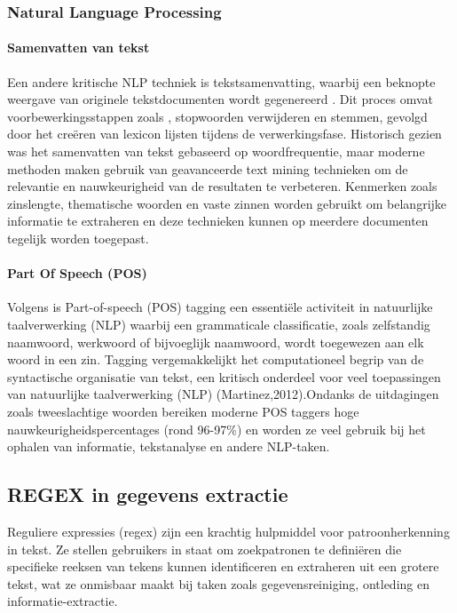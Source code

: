 \subsubsection{Natural Language Processing}
\paragraph{Samenvatten van tekst }

Een andere kritische NLP techniek is tekstsamenvatting, waarbij een beknopte weergave van originele tekstdocumenten wordt gegenereerd \autocite{Talib2016TextMining}. Dit proces omvat voorbewerkingsstappen zoals , stopwoorden verwijderen en stemmen, gevolgd door het creëren van lexicon lijsten tijdens de verwerkingsfase. Historisch gezien was het samenvatten van tekst gebaseerd op woordfrequentie, maar moderne methoden maken gebruik van geavanceerde text mining technieken om de relevantie en nauwkeurigheid van de resultaten te verbeteren. Kenmerken zoals zinslengte, thematische woorden en vaste zinnen worden gebruikt om belangrijke informatie te extraheren en deze technieken kunnen op meerdere documenten tegelijk worden toegepast.

\paragraph{Part Of Speech (POS)}
Volgens \textcite{Martinez2024} is Part-of-speech (POS) tagging een essentiële activiteit in natuurlijke taalverwerking (NLP) waarbij een grammaticale classificatie, zoals zelfstandig naamwoord, werkwoord of bijvoeglijk naamwoord, wordt toegewezen aan elk woord in een zin. Tagging vergemakkelijkt het computationeel begrip van de syntactische organisatie van tekst, een kritisch onderdeel voor veel toepassingen van natuurlijke taalverwerking (NLP) (Martinez,2012).Ondanks de uitdagingen zoals tweeslachtige woorden bereiken moderne POS taggers hoge nauwkeurigheidspercentages (rond 96-97\%) en worden ze veel gebruik bij het ophalen van informatie, tekstanalyse en andere NLP-taken.

\subsection{REGEX in gegevens extractie}

Reguliere expressies (regex) zijn een krachtig hulpmiddel voor patroonherkenning in tekst. Ze stellen gebruikers in staat om zoekpatronen te definiëren die specifieke reeksen van tekens kunnen identificeren en extraheren uit een grotere tekst, wat ze onmisbaar maakt bij taken zoals gegevensreiniging, ontleding en informatie-extractie.


